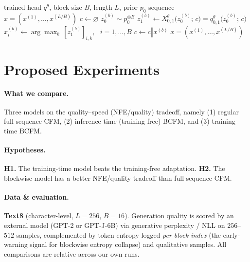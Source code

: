 \documentclass[twocolumn]{style}
\begin{document}
\begin{algorithm}[t]
\caption{One-step-per-block BCFM sampling.}
\label{alg:onestep}
\begin{algorithmic}[1]
\Require trained head $q^\theta$, block size $B$, length $L$, prior $p_0$
\Ensure sequence $x=(x^{(1)},\dots,x^{(L/B)})$
\State $c \gets \varnothing$ 
    \State $z_0^{(b)} \sim p_0^{\otimes B}$ 
    \State $z_1^{(b)} \gets X^\theta_{0,1}\!\bigl(z_0^{(b)};\,c\bigr)=q^\theta_{0,1}\!\bigl(z_0^{(b)};\,c\bigr)$ 
    \State $x^{(b)}_i \gets \arg\max_k\,[z_1^{(b)}]_{i,k}$, \ $i=1,\dots,B$ 
    \State $c \gets c \mathbin{\Vert} x^{(b)}$ 
\EndFor
\State \Return $x=(x^{(1)},\dots,x^{(L/B)})$
\end{algorithmic}
\end{algorithm}


\section{Proposed Experiments}
\paragraph{What we compare.} Three models on the quality--speed (NFE/quality) tradeoff, namely (1) regular full-sequence CFM, (2) inference-time (training-free) BCFM, and (3) training-time BCFM.

\paragraph{Hypotheses.} \textbf{H1.} The training-time model beats the training-free adaptation. \textbf{H2.} The blockwise model has a better NFE/quality tradeoff than full-sequence CFM.

\paragraph{Data \& evaluation.} \textbf{Text8} (character-level, $L=256$, $B=16$). Generation quality is scored by an external model (GPT-2 or GPT-J-6B) via generative perplexity / NLL on $256$--$512$ samples, complemented by token entropy logged \emph{per block index} (the early-warning signal for blockwise entropy collapse) and qualitative samples. All comparisons are relative across our own runs.
\end{document}
